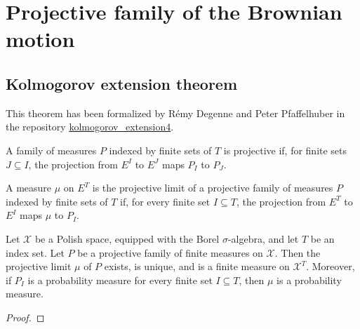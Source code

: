 \chapter{Projective family of the Brownian motion}
\label{chap:projective_family}


\section{Kolmogorov extension theorem}

This theorem has been formalized by Rémy Degenne and Peter Pfaffelhuber in the repository \href{https://github.com/RemyDegenne/kolmogorov_extension4}{kolmogorov\_extension4}.

\begin{definition}\label{def:IsProjectiveMeasureFamily}
  \mathlibok
A family of measures $P$ indexed by finite sets of $T$ is projective if, for finite sets $J \subseteq I$, the projection from $E^I$ to $E^J$ maps $P_I$ to $P_J$.
\end{definition}


\begin{definition}\label{def:IsProjectiveLimit}
  \mathlibok
A measure $\mu$ on $E^T$ is the projective limit of a projective family of measures $P$ indexed by finite sets of $T$ if, for every finite set $I \subseteq T$, the projection from $E^T$ to $E^I$ maps $\mu$ to $P_I$.
\end{definition}


\begin{theorem}\label{thm:kolmogorovExtension}
Let $\mathcal{X}$ be a Polish space, equipped with the Borel $\sigma$-algebra, and let $T$ be an index set.
Let $P$ be a projective family of finite measures on $\mathcal{X}$.
Then the projective limit $\mu$ of $P$ exists, is unique, and is a finite measure on $\mathcal{X}^T$.
Moreover, if $P_I$ is a probability measure for every finite set $I \subseteq T$, then $\mu$ is a probability measure.
\end{theorem}

\begin{proof}
\end{proof}


